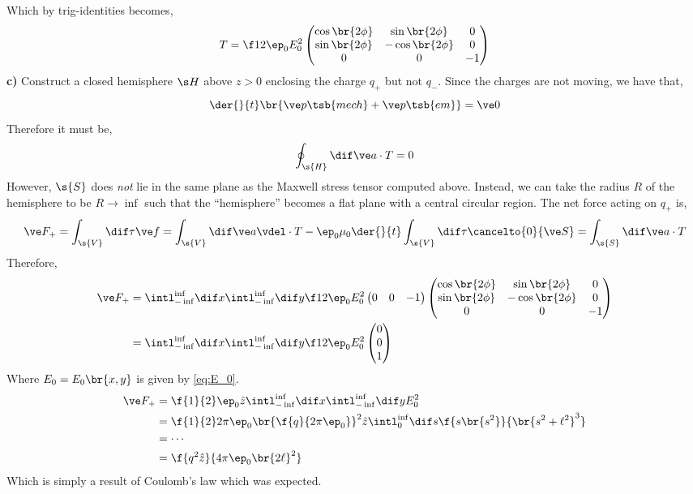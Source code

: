 \documentclass{article}
\begin{document}
Which by trig-identities becomes,
\[ T = \f12\ep_0 E_0^2 \begin{pmatrix}
    \cos\br{2\phi} & \sin \br{2\phi} & 0 \\
    \sin \br{2\phi} & -\cos\br{2\phi} & 0 \\
    0 & 0 & - 1 \\
\end{pmatrix} \]
\textbf{c)} Construct a closed hemisphere $\s H$ above $z > 0$ enclosing the charge $q_{+}$ but not $q_{-}$. Since the charges are not moving, we have that,
\[ \der{}{t} \br{\ve p\tsb{mech} + \ve p\tsb{em}} = \ve 0 \]
Therefore it must be,
\[ \oint_{\s{H}} \dif \ve a \cdot T = 0 \]
However, $\s{S}$ does \textit{not} lie in the same plane as the Maxwell stress tensor computed above. Instead, we can take the radius $R$ of the hemisphere to be $R \to \inf$ such that the ``hemisphere'' becomes a flat plane with a central circular region. The net force acting on $q_{+}$ is,
\[ \ve F_{+} = \int_{\s{V}} \dif \tau \ve f = \int_{\s{V}} \dif \ve a  \vdel \cdot T - \ep_0 \mu_0 \der{}{t} \int_{\s{V}} \dif \tau \cancelto{0}{\ve S} = \int_{\s{S}} \dif \ve a \cdot T \]
Therefore,
\begin{align*}
    \ve F_{+} &= \intl_{-\inf}^{\inf} \dif x \intl_{-\inf}^{\inf} \dif y \f12\ep_0 E_0^2 \begin{pmatrix}
        0 & 0 & -1
    \end{pmatrix} \begin{pmatrix}
        \cos\br{2\phi} & \sin \br{2\phi} & 0 \\
        \sin \br{2\phi} & -\cos\br{2\phi} & 0 \\
        0 & 0 & - 1 \\
    \end{pmatrix}\\
    &= \intl_{-\inf}^{\inf} \dif x \intl_{-\inf}^{\inf} \dif y \f12\ep_0 E_0^2 \begin{pmatrix}
        0 \\ 0 \\ 1
    \end{pmatrix}
\end{align*}
Where $E_0 = E_0\br{x,y}$ is given by \cref{eq:E_0}.
\begin{align*}
\ve F_{+} &= \f{1}{2} \ep_0 \hat z \intl_{-\inf}^{\inf} \dif x \intl_{-\inf}^{\inf} \dif y E_0^2 \\
&= \f{1}{2} 2 \pi \ep_0 \br{\f{q}{2 \pi \ep_0}}^2 \hat z \intl_{0}^{\inf} \dif s \f{s \br{s^2}}{\br{s^2+ \ell^2}^{3}} \\
&= \cdots \\
&= \f{q^2 \hat z}{4 \pi \ep_0 \br{2 \ell}^2}
\end{align*}
Which is simply a result of Coulomb's law which was expected.
\end{document}
